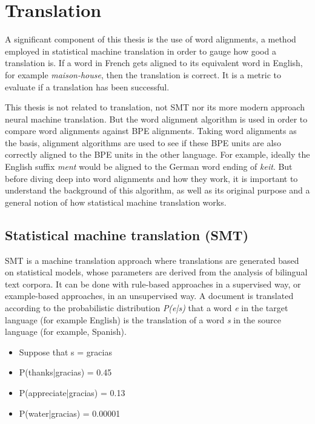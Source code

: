 %
%

\section{Translation}\label{ch:translation}

A significant component of this thesis is the use of word alignments, a method employed in statistical machine translation in order to gauge how good a translation is. If a word in French gets aligned to its equivalent word in English, for example \emph{maison-house}, then the translation is correct. It is a metric to evaluate if a translation has been successful.

This thesis is not related to translation, not SMT nor its more modern approach neural machine translation. But the word alignment algorithm is used in order to compare word alignments against BPE alignments. Taking word alignments as the basis, alignment algorithms are used to see if these BPE units are also correctly aligned to the BPE units in the other language. For example, ideally the English suffix \emph{ment} would be aligned to the German word ending of \emph{keit}. But before diving deep into word alignments and how they work, it is important to understand the background of this algorithm, as well as its original purpose and a general notion of how statistical machine translation works.

\subsection{Statistical machine translation (SMT)}

SMT is a machine translation approach where translations are generated based on statistical models, whose parameters are derived from the analysis of bilingual text corpora. It can be done with rule-based approaches in a supervised way, or example-based approaches, in an unsupervised way. A document is translated according to the probabilistic distribution \emph{P(e|s)} that a word \emph{e} in the target language (for example English) is the translation of a word \emph{s} in the source language (for example, Spanish).

\begin{itemize}
	\item Suppose that s = gracias
	\item P(thanks|gracias) = 0.45
	\item P(appreciate|gracias) = 0.13
	\item P(water|gracias) = 0.00001
\end{itemize}

